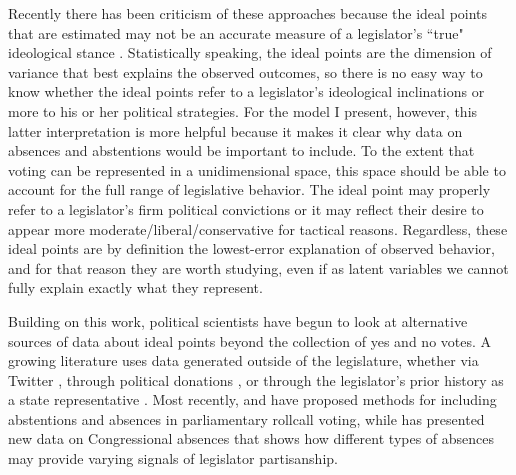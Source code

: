 	Recently there has been criticism of these approaches because the ideal points that are estimated may not be an accurate measure of a legislator's ``true" ideological stance \parencite{krehbiel2014,Caughey2016,brauninger2016}. Statistically speaking, the ideal points are the dimension of variance that best explains the observed outcomes, so there is no easy way to know whether the ideal points refer to a legislator's ideological inclinations or more to his or her political strategies. For the model I present, however, this latter interpretation is more helpful because it makes it clear why data on absences and abstentions would be important to include. To the extent that voting can be represented in a unidimensional space, this space should be able to account for the full range of legislative behavior. The ideal point may properly refer to a legislator's firm political convictions or it may reflect their desire to appear more moderate/liberal/conservative for tactical reasons. Regardless, these ideal points are by definition the lowest-error explanation of observed behavior, and for that reason they are worth studying, even if as latent variables we cannot fully explain exactly what they represent.
	
	Building on this work, political scientists have begun to look at alternative sources of data about ideal points beyond the collection of yes and no votes. A growing literature uses data generated outside of the legislature, whether via Twitter \parencite{barbera2015}, through political donations \parencite{bonica2014}, or through the legislator's prior history as a state representative \parencite{shor2011}. Most recently, \textcite{brauninger2016} and \textcite{rosas2015} have proposed methods for including abstentions and absences in parliamentary rollcall voting, while \textcite{powell2016} has presented new data on Congressional absences that shows how different types of absences may provide varying signals of legislator partisanship.
	
